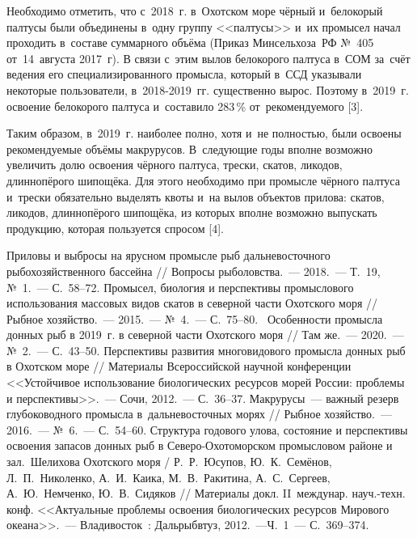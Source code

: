 Необходимо отметить, что с~2018~г. в~Охотском море чёрный и~белокорый палтусы были объединены в~одну группу <<палтусы>> и~их промысел начал проходить в~составе суммарного объёма (Приказ Минсельхоза~РФ №~405 от~14~августа 2017~г). В связи с~этим вылов белокорого палтуса в~СОМ за~счёт ведения его специализированного промысла, который в~ССД указывали некоторые пользователи, в~2018-2019~гг. существенно вырос. Поэтому в~2019~г. освоение белокорого палтуса и~составило 283\,\% от~рекомендуемого [3].

Таким образом, в~2019~г. наиболее полно, хотя и~не полностью, были освоены рекомендуемые объёмы макрурусов. В~следующие годы вполне возможно увеличить долю освоения чёрного палтуса, трески, скатов, ликодов, длиннопёрого шипощёка. Для этого необходимо при промысле чёрного палтуса и~трески обязательно выделять квоты и~на вылов объектов прилова: скатов, ликодов, длиннопёрого шипощёка, из которых вполне возможно выпускать продукцию, которая пользуется спросом [4].

\begin{thebibliography}{99}

\bibitem{}
 Приловы и выбросы на ярусном промысле рыб дальневосточного рыбохозяйственного бассейна // Вопросы рыболовства.~--- 2018.~--- Т.~19, №~1.~--- С.~58--72.
\bibitem{}
 Промысел, биология и перспективы промыслового использования массовых видов скатов в северной части Охотского моря // Рыбное хозяйство.~--- 2015.~--- №~4.~--- С.~75--80.
\bibitem{}
 Особенности промысла донных рыб в 2019~г. в северной части Охотского моря // Там же.~--- 2020.~--- №~2.~--- С.~43--50.
\bibitem{}
 Перспективы развития многовидового промысла донных рыб в Охотском море // Материалы Всероссийской научной конференции <<Устойчивое использование биологических ресурсов морей России: проблемы и перспективы>>.~--- Сочи, 2012.~--- С.~36--37.
\bibitem{}
 Макрурусы~--- важный резерв глубоководного промысла в~дальневосточных морях // Рыбное хозяйство.~--- 2016.~--- №~6.~--- С.~54--60.
\bibitem{}
 Структура годового улова, состояние и перспективы освоения запасов донных рыб в Северо-Охотоморском промысловом районе и зал.~Шелихова Охотского моря / Р.~Р.~Юсупов, Ю.~К.~Семёнов, Л.~П.~Николенко, А.~И.~Каика, М.~В.~Ракитина, А.~С.~Сергеев, А.~Ю.~Немченко, Ю.~В.~Сидяков // Материалы докл. II~междунар. науч.-техн. конф. <<Актуальные проблемы освоения биологических ресурсов Мирового океана>>.~--- Владивосток~: Дальрыбвтуз, 2012.~---Ч.~1~--- С.~369--374.
\end{thebibliography}

